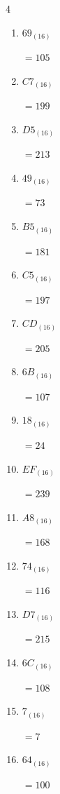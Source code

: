 \begin{multicols}{4}
\begin{enumerate}
        $=233$

  \item $69_{(16)}$

        $=105$

  \item $C7_{(16)}$

        $=199$

  \item $D5_{(16)}$

        $=213$

  \item $49_{(16)}$

        $=73$

\columnbreak %

  \item $B5_{(16)}$

        $=181$

  \item $C5_{(16)}$

        $=197$

  \item $CD_{(16)}$

        $=205$

  \item $6B_{(16)}$

        $=107$

  \item $18_{(16)}$

        $=24$

  \item $EF_{(16)}$

        $=239$

  \item $A8_{(16)}$

        $=168$

  \item $74_{(16)}$

        $=116$

  \item $D7_{(16)}$

        $=215$

  \item $6C_{(16)}$

        $=108$

  \item $7_{(16)}$

        $=7$

  \item $64_{(16)}$

        $=100$


\end{enumerate}
\end{multicols}
